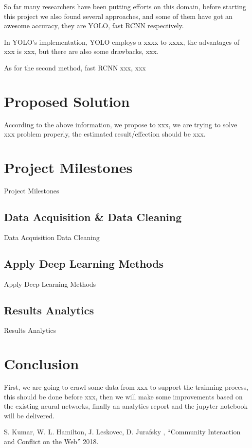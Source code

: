 \documentclass[conference]{IEEEtran}
\begin{document}
So far many researchers have been putting efforts on this domain, before starting this project we also found several approaches, and some of them have got an awesome accuracy, they are YOLO, fast RCNN respectively.

In YOLO's implementation, YOLO employs a {xxxx} to {xxxx}, the advantages of {xxx} is {xxx}, but there are also some drawbacks, {xxx}.

As for the second method, fast RCNN {xxx}, {xxx}

\section{Proposed Solution}

According to the above information, we propose to {xxx}, we are trying to solve {xxx} problem properly, the estimated result/effection should be {xxx}.

\section{Project Milestones}

Project Milestones

\subsection{Data Acquisition \& Data Cleaning}

Data Acquisition Data Cleaning

\subsection{Apply Deep Learning Methods}

Apply Deep Learning Methods

\subsection{Results Analytics}

Results Analytics

\section{Conclusion}

First, we are going to crawl some data from {xxx} to support the trainning process, this should be done before {xxx}, then we will make some improvements based on the existing neural networks, finally an analytics report and the jupyter notebook will be delivered.

\begin{thebibliography}{00}
  
   S. Kumar, W. L. Hamilton, J. Leskovec, D. Jurafsky , ``Community Interaction and Conflict on the Web'' 2018.
  
\end{thebibliography}
\end{document}
